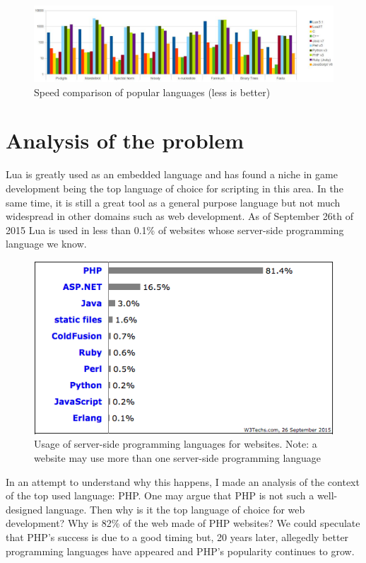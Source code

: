 \documentclass{article}
\begin{document}
\begin{figure}[h]
\includegraphics[scale=0.4]{speed.png}
\caption{\label{fig:speedcomparison} Speed comparison of popular languages (less is better)}
\end{figure}

	\newpage
\section{Analysis of the problem}

Lua is greatly used as an embedded language and has found a niche in game development being the top language of choice for scripting in this area\autocite{engine}. In the same time, it is still a great tool as a general purpose language but not much widespread in other domains such as web development. As of September 26th of 2015 Lua is used in less than 0.1\% of websites whose server-side programming language we know\autocite{w3server}. \\

\begin{figure}[h]
\centering\includegraphics[scale=0.7]{serverlangs.png}
\caption{\label{fig:serverlangs} Usage of server-side programming languages for websites. Note: a website may use more than one server-side programming language}
\end{figure}

In an attempt to understand why this happens, I made an analysis of the context of the top used language: PHP. One may argue that PHP is not such a well-designed language. Then why is it the top language of choice for web development? Why is 82\% of the web made of PHP websites? We could speculate that PHP's success is due to a good timing but, 20 years later, allegedly better programming languages have appeared and PHP's popularity continues to grow\autocite{phptime}.\\
\end{document}
